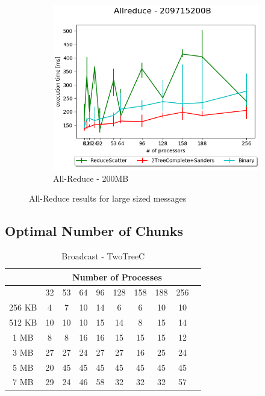 \documentclass[sigplan,review,anonymous]{acmart}\settopmatter{printfolios=true,printccs=false,printacmref=false}
\begin{document}
\begin{figure}
\begin{subfigure}{0.5\textwidth}
  \centering
  \includegraphics[width=0.5\linewidth]{images/Results/AllReduce/AllReduceComp2_209715200B.png}
  \caption{All-Reduce - 200MB}
  \label{reduce-selected-7MB}
\end{subfigure}
\caption{All-Reduce results for large sized messages}
\label{graph-reduce-medium2-selected}
\end{figure}

\subsection{Optimal Number of Chunks}

\begin{table}[]
\caption{Broadcast - TwoTreeC}
\begin{center}
\begin{tabular}{|c|c|c|c|c|c|c|c|c|c|}
\hline
& \multicolumn{8}{c|}{Number of Processes} \\
\hline
& 32 & 53 & 64 & 96 & 128 & 158 & 188 & 256\\
\hline
 256 KB & 4 & 7 & 10 & 14 & 6 & 6 & 10 & 10\\
 512 KB & 10 & 10 & 10 & 15 & 14 & 8 & 15 & 14\\
 1 MB & 8 & 8 & 16 & 16 & 15 & 15 & 15 & 12\\
 3 MB & 27 & 27 & 24 & 27 & 27 & 16 & 25 & 24\\
 5 MB & 20 & 45 & 45 & 45 & 45 & 45 & 45 & 45\\
 7 MB & 29 & 24 & 46 & 58 & 32 & 32 & 32 & 57\\
\hline
\end{tabular}
\end{center}
\end{table}
\end{document}

